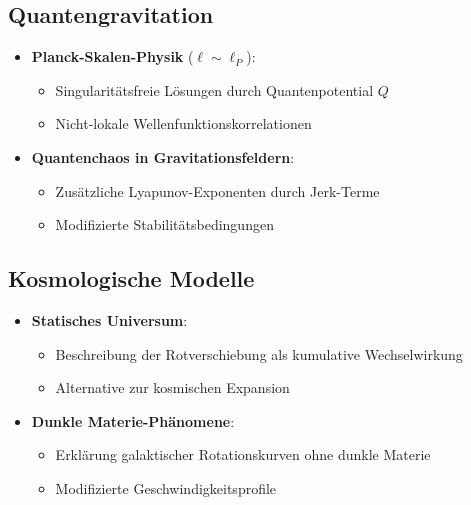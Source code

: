 \subsection{Quantengravitation}
\begin{itemize}
    \item \textbf{Planck-Skalen-Physik} ($\ell \sim \ell_P$):
    \begin{itemize}
        \item Singularitätsfreie Lösungen durch Quantenpotential $Q$
        \item Nicht-lokale Wellenfunktionskorrelationen
    \end{itemize}
    
    \item \textbf{Quantenchaos in Gravitationsfeldern}:
    \begin{itemize}
        \item Zusätzliche Lyapunov-Exponenten durch Jerk-Terme
        \item Modifizierte Stabilitätsbedingungen
    \end{itemize}
\end{itemize}

\subsection{Kosmologische Modelle}
\begin{itemize}
    \item \textbf{Statisches Universum}:
    \begin{itemize}
        \item Beschreibung der Rotverschiebung als kumulative Wechselwirkung
        \item Alternative zur kosmischen Expansion
    \end{itemize}
    
    \item \textbf{Dunkle Materie-Phänomene}:
    \begin{itemize}
        \item Erklärung galaktischer Rotationskurven ohne dunkle Materie
        \item Modifizierte Geschwindigkeitsprofile
    \end{itemize}
\end{itemize}

